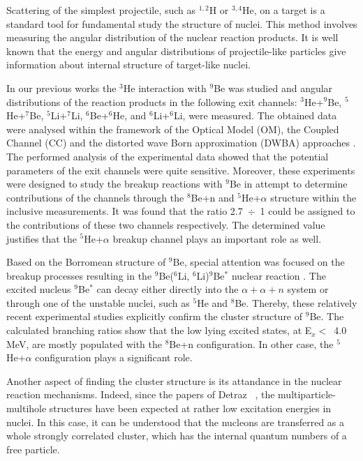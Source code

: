 \documentclass[10pt]{iopart}
\begin{document}
	Scattering of the simplest projectile, such as $^{1,2}$H or $^{3,4}$He, on a target is a standard tool for fundamental study the structure of nuclei.
	This method involves measuring the angular distribution of the nuclear reaction products.
	It is well known that the energy and angular distributions of projectile-like particles give information about internal structure of target-like nuclei.
	
	In our previous works \cite{lukyanov2014, lukyanov2015, janseitov2018} the $^3$He interaction with $^9$Be was studied and angular distributions of the reaction products in the following exit channels: $^3$He+$^9$Be, $^5$He+$^7$Be, $^5$Li+$^7$Li, $^6$Be+$^6$He, and $^6$Li+$^6$Li, were measured. The obtained data were analysed within the framework of the Optical Model (OM), the Coupled Channel (CC) and the distorted wave Born approximation (DWBA) approaches  .
	The performed analysis of the experimental data showed that the potential parameters of the exit channels were quite sensitive.
	Moreover, these experiments were designed to study the breakup reactions with $^9$Be in attempt to determine contributions of the channels through the $^8$Be+n  and  $^5$He+$\alpha$ structure within the inclusive measurements.
	It was found that the ratio 2.7~$\div$~1 could be assigned to the contributions of these two channels respectively. The determined value justifies that the $^5$He+$\alpha$ breakup channel plays an important role as well.

Based on the Borromean structure of $^9$Be, special attention was focused on the breakup processes resulting in the $^9$Be($^6$Li, $^6$Li)$^9$Be$^*$ nuclear reaction \cite{brown2007, papka2007}. The excited nucleus $^9$Be$^*$ can decay either directly into the $\alpha+\alpha+n$ system or through one of the unstable nuclei, such as $^5$He and $^8$Be. Thereby, these relatively recent experimental studies explicitly confirm the cluster structure of $^9$Be.
The calculated branching ratios  show that the low lying excited states, at E$_x <$~4.0 MeV,  are mostly populated with the $^8$Be+n configuration. In other case, the $^5$He+$\alpha$ configuration plays a significant  role.

Another aspect of finding the cluster structure is its attandance in the nuclear reaction mechanisms. Indeed, since the papers of Detraz \etal~\cite{detraz1970, detraz1974}, the multiparticle-multihole structures have been expected at rather low excitation energies in nuclei. In this case, it can be understood that the nucleons are transferred as a whole strongly correlated cluster, which has the internal quantum numbers of a free particle.
\end{document}
